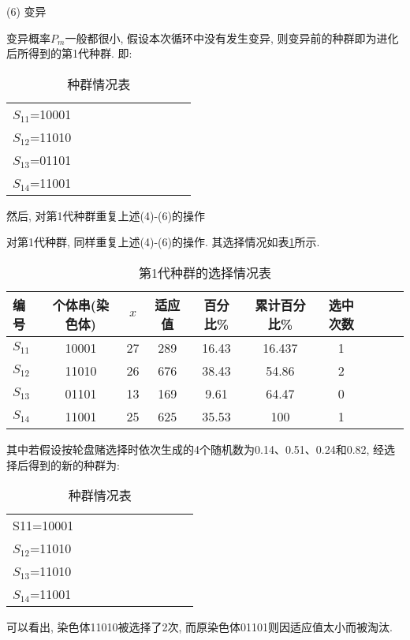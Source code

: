  (6) 变异

变异概率$P_m$一般都很小, 假设本次循环中没有发生变异, 则变异前的种群即为进化后所得到的第1代种群. 即:

\begin{table} [H]
\caption{种群情况表}
\begin{center}
\begin{tabular} {lccccccccc}
\hline
    $S_{11}$=10001\\
    $S_{12}$=11010\\
    $S_{13}$=01101\\
    $S_{14}$=11001\\
\hline
\end{tabular}
\end{center}
\end{table}

然后, 对第1代种群重复上述(4)-(6)的操作

对第1代种群, 同样重复上述(4)-(6)的操作. 其选择情况如表\ref{AI_table2019112807}所示.
\begin{table} [H]
\caption{第1代种群的选择情况表}
\begin{center}
\begin{tabular} {lccccccccc}
  \hline
编号	&个体串(染色体)&	 $x$	&适应值	&百分比\%	&累计百分比\%	&选中次数\\
  \hline
$S_{11}$	&10001	&27	&289	&16.43	&16.437	&1\\
$S_{12}$&	11010	&26	&676&38.43	&54.86	&2\\
$S_{13}$&	01101	&13	&169	&9.61	&64.47	&0\\
$S_{14}$	&11001	&25	&625	&35.53	&100	&1\\
\hline
\end{tabular}
\end{center}
\label{AI_table2019112807}
\end{table}
其中若假设按轮盘赌选择时依次生成的4个随机数为0.14、0.51、0.24和0.82, 经选择后得到的新的种群为:
\begin{table} [H]
\caption{种群情况表}
\begin{center}
\begin{tabular} {lccccccccc}
\hline
S11=10001\\
    $S_{12}$=11010\\
    $S_{13}$=11010\\
    $S_{14}$=11001\\
\hline
\end{tabular}
\end{center}
\end{table}
可以看出, 染色体11010被选择了2次, 而原染色体01101则因适应值太小而被淘汰.

